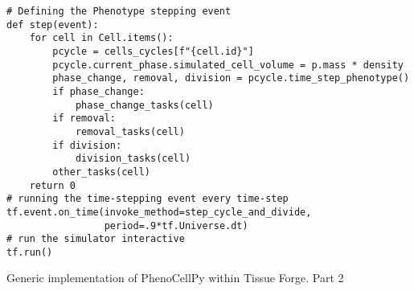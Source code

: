 \begin{listing}[H]
\begin{verbatim}
# Defining the Phenotype stepping event 
def step(event):
    for cell in Cell.items():
        pcycle = cells_cycles[f"{cell.id}"]
        pcycle.current_phase.simulated_cell_volume = p.mass * density
        phase_change, removal, division = pcycle.time_step_phenotype()
        if phase_change:
            phase_change_tasks(cell)
        if removal:
            removal_tasks(cell)
        if division:
            division_tasks(cell)
        other_tasks(cell)
    return 0
# running the time-stepping event every time-step
tf.event.on_time(invoke_method=step_cycle_and_divide, 
                 period=.9*tf.Universe.dt)
# run the simulator interactive
tf.run()
\end{verbatim}
\caption{Generic implementation of PhenoCellPy within Tissue Forge. Part 2}\label{code:ex:tf:init:part2}
\end{listing}




